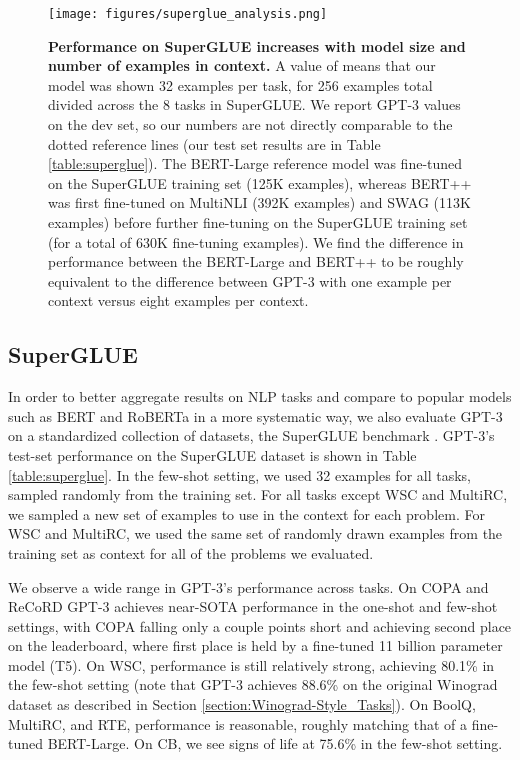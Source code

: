 \documentclass{article}
\begin{document}
     \begin{figure}
\centering\texttt{[image: figures/superglue\_analysis.png]}
\caption{
\textbf{
Performance on SuperGLUE increases with model size and number of examples in context.} A value of  means that our model was shown 32 examples per task, for 256 examples total divided across the 8 tasks in SuperGLUE. We report GPT-3 values on the dev set, so our numbers are not directly comparable to the dotted reference lines (our test set results are in Table \ref{table:superglue}). The BERT-Large reference model was fine-tuned on the SuperGLUE training set (125K examples), whereas BERT++ was first fine-tuned on MultiNLI (392K examples) and SWAG (113K examples) before further fine-tuning on the SuperGLUE training set (for a total of 630K fine-tuning examples). We find the difference in performance between the BERT-Large and BERT++ to be roughly equivalent to the difference between GPT-3 with one example per context versus eight examples per context.
}
\label{graph:superglue_analysis}
\end{figure}
     \subsection{SuperGLUE}
    \label{section:SuperGLUE}
    In order to better aggregate results on NLP tasks and compare to popular models such as BERT and RoBERTa in a more systematic way, we also evaluate GPT-3 on a standardized collection of datasets, the SuperGLUE benchmark \cite{wang2019superglue} \citep{wang2019superglue} \citep{clark2019boolq} \citep{demarneffe:cb} \citep{roemmele2011choice} \citep{khashabi2018looking} \citep{zhang2018record} \citep{dagan2006pascal} \citep{bar2006second} \citep{giampiccolo2007third} \citep{bentivogli2009fifth} \citep{pilehvar2018wic} \citep{poliak2018dnc}. GPT-3’s test-set performance on the SuperGLUE dataset is shown in Table \ref{table:superglue}.  In the few-shot setting, we used 32 examples for all tasks, sampled randomly from the training set. For all tasks except WSC and MultiRC, we sampled a new set of examples to use in the context for each problem. For WSC and MultiRC, we used the same set of randomly drawn examples from the training set as context for all of the problems we evaluated.

We observe a wide range in GPT-3’s performance across tasks.  On COPA and ReCoRD GPT-3 achieves near-SOTA performance in the one-shot and few-shot settings, with COPA falling only a couple points short and achieving second place on the leaderboard, where first place is held by a fine-tuned 11 billion parameter model (T5). On WSC, performance is still relatively strong, achieving 80.1\% in the few-shot setting (note that GPT-3 achieves 88.6\% on the original Winograd dataset as described in Section \ref{section:Winograd-Style_Tasks}).  On BoolQ, MultiRC, and RTE, performance is reasonable, roughly matching that of a fine-tuned BERT-Large. On CB, we see signs of life at 75.6\% in the few-shot setting.
\end{document}
